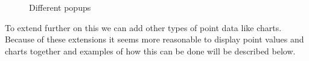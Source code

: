 \documentclass[11pt,a4paper,titlepage,oneside]{report}
\begin{document}
\begin{figure}[h]
\caption{Different popups}
\end{figure}
To extend further on this we can add other types of point data like charts. Because of these extensions it seems more reasonable to display point values and charts together and examples of how this can be done will be described below.
\end{document}
